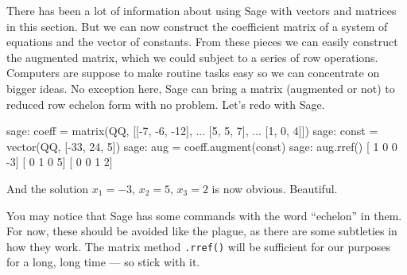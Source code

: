 There has been a lot of information about using Sage with vectors and matrices in this section.  But we can now construct the coefficient matrix of a system of equations and the vector of constants.  From these pieces we can easily construct the augmented matrix, which we could subject to a series of row operations.  Computers are suppose to make routine tasks easy so we can concentrate on bigger ideas.  No exception here, Sage can bring a matrix (augmented or not) to reduced row echelon form with no problem.  Let's redo  with Sage.
%
\begin{sageexample}
sage: coeff = matrix(QQ, [[-7, -6, -12],
...                       [5,   5,   7],
...                       [1,   0,   4]])
sage: const = vector(QQ, [-33, 24, 5])
sage: aug = coeff.augment(const)
sage: aug.rref()
[ 1  0  0 -3]
[ 0  1  0  5]
[ 0  0  1  2]
\end{sageexample}
%
And the solution $x_1=-3$, $x_2=5$, $x_3=2$ is now obvious.  Beautiful.\par
%
You may notice that Sage has some commands with the word ``echelon'' in them.  For now, these should be avoided like the plague, as there are some subtleties in how they work.  The matrix method \verb?.rref()? will be sufficient for our purposes for a long, long time --- so stick with it.
%
\begin{sageverbatim}
\end{sageverbatim}
